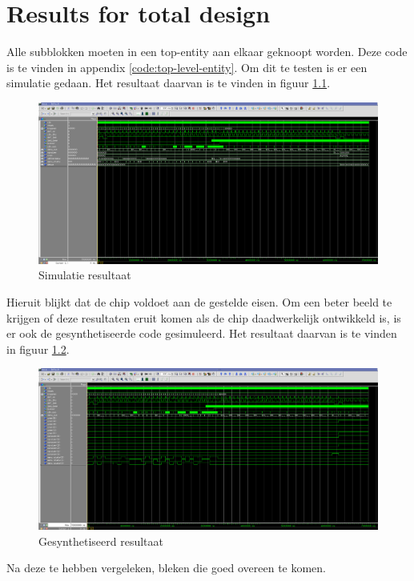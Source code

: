 \chapter{Results for total design}
Alle subblokken moeten in een top-entity aan elkaar geknoopt worden. Deze code is te vinden in appendix \ref{code:top-level-entity}. Om dit te testen is er een simulatie gedaan. Het resultaat daarvan is te vinden in figuur \ref{fig:uiteinres}.

\begin{figure}[h!]
\includegraphics[width=15cm]{Afsluiting/behaviour.png}
\caption{Simulatie resultaat}
\label{fig:uiteinres}
\end{figure}

Hieruit blijkt dat de chip voldoet aan de gestelde eisen. Om een beter beeld te krijgen of deze resultaten eruit komen als de chip daadwerkelijk ontwikkeld is, is er ook de gesynthetiseerde code gesimuleerd. Het resultaat daarvan is te vinden in figuur \ref{fig:uiteinsimres}.

\begin{figure}[h!]
\includegraphics[width=15cm]{Afsluiting/synthesised.png}
\caption{Gesynthetiseerd resultaat}
\label{fig:uiteinsimres}
\end{figure}

Na deze te hebben vergeleken, bleken die goed overeen te komen.